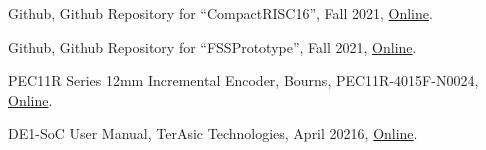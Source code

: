 \documentclass[conference]{IEEEtran}
\begin{document}
\begin{thebibliography}{10}

  Github,
  Github Repository for ``CompactRISC16'',
  Fall 2021,
  \href{https://github.com/Petersoj/CompactRISC16}{Online}.

  Github,
  Github Repository for ``FSSPrototype'',
  Fall 2021,
  \href{https://github.com/Petersoj/FSSPrototype}{Online}.

  PEC11R Series 12mm Incremental Encoder,
  Bourns,
  PEC11R-4015F-N0024,
  \href{https://www.mouser.com/ProductDetail/Bourns/PEC11R-4015F-N0024?qs=Zq5ylnUbLm5obMMbrbYrpA\%3D\%3D}{Online}.

  DE1-SoC User Manual,
  TerAsic Technologies,
  April 20216,
  \href{https://www.intel.com/content/dam/www/programmable/us/en/portal/dsn/42/doc-us-dsnbk-42-1004282204-de1-soc-user-manual.pdf}{Online}.

\end{thebibliography}

\clearpage
{}

\end{document}
